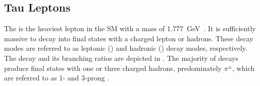 

\subsection{Tau Leptons}%
\label{sec:tau_rec}

The \taulepton is the heaviest lepton in the SM with a mass of
\SI{1.777}{\GeV}~\cite{pdg2020}. It is sufficiently massive to decay into final
states with a charged lepton or hadrons. These decay modes are referred to as
leptonic (\taulep) and hadronic (\tauhad) decay modes, respectively. The
\taulepton decay and its branching ratios are depicted in
. The majority of \taulepton decays produce final
states with one or three charged hadrons, predominately $\pi^{\pm}$, which are
referred to as 1- and 3-prong \tauhad.


